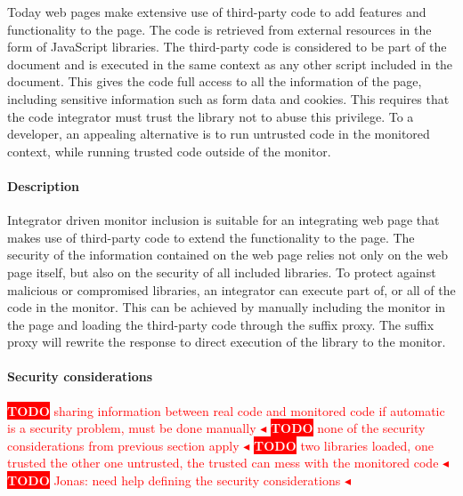 \documentclass{llncs}
\newcommand{\todo}[1]{\colorbox{red}{\textcolor{white}{\sffamily\bfseries\scriptsize TODO}} \textcolor{red}{#1} \textcolor{red}{$\blacktriangleleft$}}
\begin{document}

Today web pages make extensive use of third-party code to add features 
and functionality to the page. The code is retrieved from external resources in 
the form of JavaScript libraries. The third-party code is considered to be part 
of the document and is executed in the same context as any other script 
included in the document. This gives the code full access to all the information 
of the page, including sensitive information such as form data and cookies. 
This requires that the code integrator must 
trust the library not to abuse this privilege. To a developer, an appealing alternative 
is to run untrusted code in the monitored context, while running trusted code outside of the 
monitor. 

\paragraph{Description}
Integrator driven monitor inclusion is suitable for an integrating web page 
that makes use of third-party code to extend the 
functionality to the page. The security of the information contained on the web 
page relies not only on the web page itself, but also on the security of all 
included libraries. To protect against malicious or compromised libraries, 
an integrator can execute part of, or all of the code in the monitor.
This can be achieved by manually including the monitor in the page and loading the 
third-party code through the suffix proxy. The suffix proxy will rewrite the 
response to direct execution of the library to the monitor. 

\paragraph{Security considerations}
\todo{sharing information between real code and monitored code if automatic is a security problem, must be done manually}
\todo{none of the security considerations from previous section apply}
\todo{two libraries loaded, one trusted the other one untrusted, the trusted can mess with the monitored code}
\todo{Jonas: need help defining the security considerations}
\end{document}
